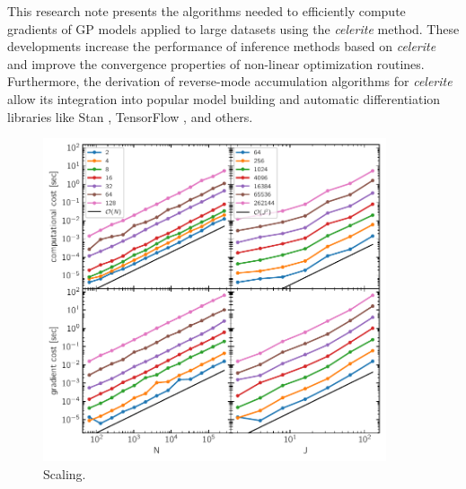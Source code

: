 \documentclass[rnaas]{aastex62}
\newcommand{\figurelabel}[1]{\label{fig:#1}}
\begin{document}
This research note presents the algorithms needed to efficiently compute
gradients of GP models applied to large datasets using the \emph{celerite}
method.
These developments increase the performance of inference methods based on
\emph{celerite} and improve the convergence properties of non-linear
optimization routines.
Furthermore, the derivation of reverse-mode accumulation algorithms for
\emph{celerite} allow its integration into popular model building and
automatic differentiation libraries like Stan \citep{Carpenter:2015},
TensorFlow \citep{Abadi:2016}, and others.


\begin{figure}[h!]
\begin{center}
\includegraphics[width=0.9\textwidth]{figure.pdf}
\caption{%
    Scaling.
\figurelabel{figure}}
\end{center}
\end{figure}



\end{document}
